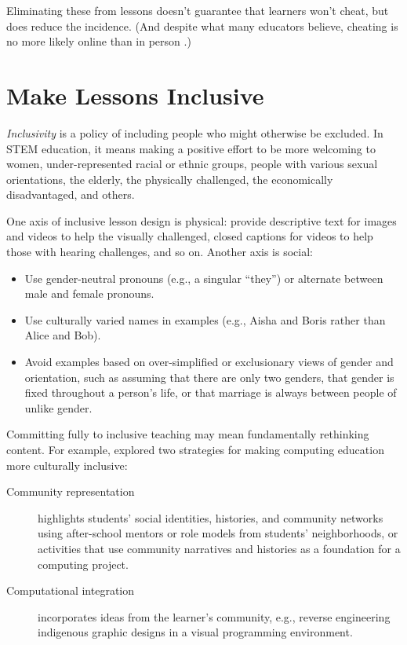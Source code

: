 \documentclass[10pt,letterpaper]{article}
\newcommand{\rulemajor}[1]{\section{#1}}
\begin{document}
Eliminating these from lessons doesn't guarantee that learners won't cheat, but
does reduce the incidence.  (And despite what many educators believe, cheating
is no more likely online than in person \cite{Beck2014}.)

\rulemajor{Make Lessons Inclusive}

\emph{Inclusivity} is a policy of including people who might otherwise be
excluded.  In STEM education, it means making a positive effort to be more
welcoming to women, under-represented racial or ethnic groups, people with
various sexual orientations, the elderly, the physically challenged, the
economically disadvantaged, and others.

One axis of inclusive lesson design is physical: provide descriptive text for
images and videos to help the visually challenged, closed captions for videos to
help those with hearing challenges, and so on.  Another axis is social:

\begin{itemize}

\item Use gender-neutral pronouns (e.g., a singular ``they'') or alternate
  between male and female pronouns.

\item Use culturally varied names in examples (e.g., Aisha and Boris rather than
  Alice and Bob).

\item Avoid examples based on over-simplified or exclusionary views of gender
  and orientation, such as assuming that there are only two genders, that gender
  is fixed throughout a person's life, or that marriage is always between people
  of unlike gender.

\end{itemize}

Committing fully to inclusive teaching may mean fundamentally rethinking
content.  For example, \cite{Lach2018} explored two strategies for making
computing education more culturally inclusive:

\begin{description}

\item[Community representation] highlights students' social identities,
  histories, and community networks using after-school mentors or role models
  from students' neighborhoods, or activities that use community narratives and
  histories as a foundation for a computing project.

\item[Computational integration] incorporates ideas from the learner's
  community, e.g., reverse engineering indigenous graphic designs in a visual
  programming environment.

\end{description}
\end{document}
